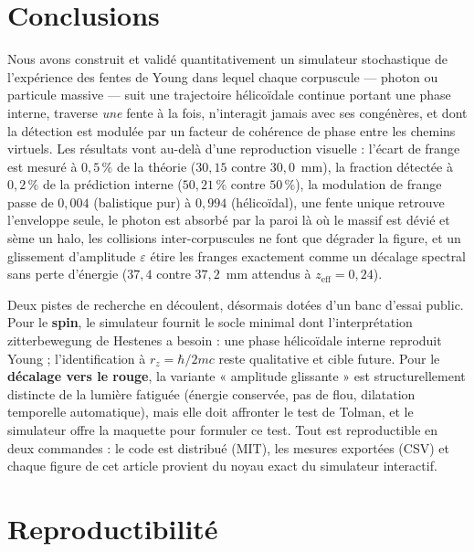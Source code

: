 \section{Conclusions}\label{sec:ccl}

Nous avons construit et validé quantitativement un simulateur stochastique de
l'expérience des fentes de Young dans lequel chaque corpuscule --- photon ou
particule massive --- suit une trajectoire hélicoïdale continue portant une phase
interne, traverse \emph{une} fente à la fois, n'interagit jamais avec ses
congénères, et dont la détection est modulée par un facteur de cohérence de phase
entre les chemins virtuels. Les résultats vont au-delà d'une reproduction
visuelle : l'écart de frange est mesuré à $0{,}5\,\%$ de la théorie
($30{,}15$ contre $30{,}0$~mm), la fraction détectée à $0{,}2\,\%$ de la
prédiction interne ($50{,}21\,\%$ contre $50\,\%$), la modulation de frange passe
de $0{,}004$ (balistique pur) à $0{,}994$ (hélicoïdal), une fente unique
retrouve l'enveloppe seule, le photon est absorbé par la paroi là où le massif
est dévié et sème un halo, les collisions inter-corpuscules ne font que
dégrader la figure, et un glissement d'amplitude $\varepsilon$ étire les franges
exactement comme un décalage spectral sans perte d'énergie ($37{,}4$ contre
$37{,}2$~mm attendus à $z_{\mathrm{eff}} = 0{,}24$).

Deux pistes de recherche en découlent, désormais dotées d'un banc d'essai
public. Pour le \textbf{spin}, le simulateur fournit le socle minimal dont
l'interprétation zitterbewegung de Hestenes a besoin : une phase hélicoïdale
interne reproduit Young ; l'identification à $r_z = \hbar/2mc$ reste qualitative
et cible future. Pour le \textbf{décalage vers le rouge}, la variante
« amplitude glissante » est structurellement distincte de la lumière fatiguée
(énergie conservée, pas de flou, dilatation temporelle automatique), mais elle
doit affronter le test de Tolman, et le simulateur offre la maquette pour
formuler ce test. Tout est reproductible en deux commandes : le code est
distribué (MIT), les mesures exportées (CSV) et chaque figure de cet article
provient du noyau exact du simulateur interactif.

\appendix
\section{Reproductibilité}\label{sec:repro}

